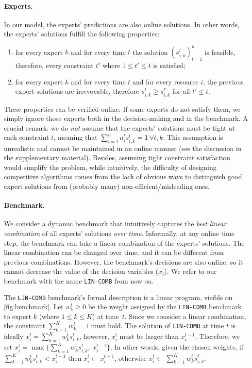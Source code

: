 \paragraph{Experts.} In our model, the experts' predictions are also online solutions. In other words, the experts' solutions
fulfill the following properties:
\begin{enumerate}
	\item for every expert $k$ and for every time $t$ the solution $(s_{i,k}^{t})_{i=1}^{n}$ is feasible, therefore, every constraint $t'$ where $1 \leq t' \leq t$ is satisfied;
	\item for every expert $k$ and for every time $t$ and for every resource $i$, the previous expert solutions are irrevocable, therefore $s_{i,k}^{t} \geq s_{i,k}^{t'}$ for all $t' \leq t$.
\end{enumerate}
These properties can be verified online. If some experts do not satisfy them, we simply ignore those experts both in the decision-making and in the benchmark.
A crucial remark: we do \emph{not} assume that the experts' solutions must be tight at each constraint $t$, meaning that $\sum_{i=1}^{n} a_{i}^{t} s_{i,k}^{t} = 1 ~ \forall t, k$.
This assumption is unrealistic and cannot be maintained in an online manner (see the discussion in the supplementary material).
Besides, assuming tight constraint satisfaction would simplify the problem, while intuitively,
the difficulty of designing competitive algorithms comes from the lack of obvious ways to distinguish
good expert solutions from (probably many) non-efficient/misleading ones.

\paragraph{Benchmark.}
We consider a dynamic benchmark that intuitively captures the \emph{best linear combination} of all experts' solutions \emph{over time}.
Informally, at any online time step, the benchmark can take a linear combination of the experts' solutions.
The linear combination can be changed over time, and it can be different from previous combinations.
However, the benchmark's decisions are also online, so it cannot decrease the value of the decision variables ($x_{i}$).
We refer to our benchmark with the name \texttt{LIN-COMB} from now on.

The \texttt{LIN-COMB} benchmark's formal description is a linear program, visible on \cref{fig:benchmark}.
Let $w_{k}^{t} \geq 0$ be the weight assigned by the \texttt{LIN-COMB} benchmark to expert $k$ (where $1 \leq k \leq K$) at time~$t$.
Since we consider a linear combination, the constraint $ \sum_{k=1}^{K} w_{k}^{t} = 1$ must hold.
The solution of \texttt{LIN-COMB} at time $t$ is ideally $x_{i}^{t} = \sum_{k=1}^{K} w_{k}^{t} s_{i,k}^{t}$,
however, $x_{i}^{t}$ must be larger than $x_{i}^{t-1}$.
Therefore, we set $x_{i}^{t} = \max\bigl\{\sum_{k=1}^{K} w_{k}^{t} s_{i,k}^{t},\ x_{i}^{t-1}\bigr\}$.
In other words, given the chosen weights, if  $\sum_{k=1}^{K} w_{k}^{t} s_{i,k}^{t} < x_{i}^{t-1}$ then $x_{i}^{t} \gets x_{i}^{t-1}$,
otherwise $x_{i}^{t} \gets \sum_{k=1}^{K} w_{k}^{t} s_{i,k}^{t}$.

